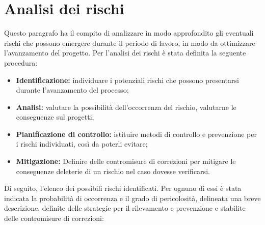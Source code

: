 
\section{Analisi dei rischi}
Questo paragrafo ha il compito di analizzare in modo approfondito gli eventuali rischi che possono emergere durante il periodo di lavoro, in modo da ottimizzare l'avanzamento del progetto. Per l'analisi dei rischi è stata definita la seguente procedura:

\begin{itemize}
\item \textbf{Identificazione:} individuare i potenziali rischi che possono presentarsi durante l'avanzamento del processo;
\item \textbf{Analisi:} valutare la possibilità dell'occorrenza del rischio, valutarne le conseguenze sul progetti;
\item \textbf{Pianificazione di controllo:} istituire metodi di controllo e prevenzione per i rischi individuati, così da poterli evitare;
\item \textbf{Mitigazione:} Definire delle contromisure di correzioni per mitigare le conseguenze deleterie di un rischio nel caso dovesse verificarsi. 
\end{itemize}

Di seguito, l'elenco dei possibili rischi identificati. Per ognuno di essi è stata indicata la probabilità di occorrenza e il grado di pericolosità, delineata una breve descrizione, definite delle strategie per il rilevamento e prevenzione e stabilite delle contromisure di correzioni: 

